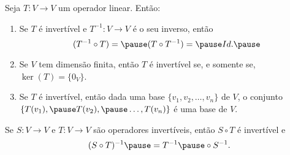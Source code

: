 \documentclass{beamer}
\begin{document}
\begin{frame}
    \begin{proposicao}
        Seja $T \colon V \to V$ um operador linear. \pause Então:\pause
        \begin{enumerate}[label={\roman*})]
            \item Se $T$ é invertível \pause e $T^{-1} \colon V \to V$ é o seu inverso, \pause então
                \[
                    (T^{-1} \circ T) = \pause (T \circ T^{-1}) = \pause Id.\pause
                \]

            \vspace{.5cm}

            \item Se $V$ tem dimensão finita, \pause então $T$ é invertível \pause se, e somente se, \pause $\ker(T) = \{0_V\}$.\pause

            \vspace{.5cm}

            \item Se $T$ é invertível, \pause então dada uma base $\{v_1, v_2, \dots, v_n\}$ de $V$, \pause o conjunto $\{T(v_1), \pause T(v_2), \pause \dots, T(v_n)\}$ \pause é uma base de $V$.
        \end{enumerate}
    \end{proposicao}
\end{frame}

\begin{frame}
    \begin{proposicao}
        Se $S \colon V \to V$ e $T \colon V \to V$ \pause são operadores invertíveis, \pause então $S \circ T$ é invertível e\pause
        \[
            (S \circ T)^{-1} \pause = T^{-1} \pause \circ S^{-1}.
        \]
    \end{proposicao}
\end{frame}
\end{document}
